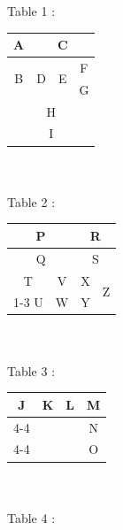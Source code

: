 \documentclass{article}
\begin{document}
Table 1 : \\

\setlength{\extrarowheight}{7pt}
\begin{tabular}{|c|c|c|c|}
\hline
A & \multicolumn{3}{c|}{C} \\
\hline
\multirow{2}{*}{B} & \multirow{2}{*}{D} & \multirow{2}{*}{E} & F \\
\cline{4-4}
 &  &  & G \\
\hline
\multicolumn{4}{|c|}{H} \\
\hline
\multicolumn{4}{|c|}{I} \\
\hline 
\end{tabular} \\ \\

Table 2 : \\

\setlength{\extrarowheight}{10pt}
\begin{tabular}{|c|c|c|c|}
\hline
\multicolumn{2}{|c|}{P} & \multicolumn{2}{c|}{R} \\
\hline
\multicolumn{2}{|c|}{Q} & \multicolumn{2}{c|}{S} \\
\hline
T & V & X & \multirow{2}{*}{Z}\\
\cline{1-3}
U & W & Y &  \\
\hline

\end{tabular} \\ \\

Table 3 : \\

\setlength{\extrarowheight}{7pt}
\begin{tabular}{|c|c|c|c|}

\hline
\multirow{3}{*}{J} & \multirow{3}{*}{K} & \multirow{3}{*}{L} & M \\
\cline{4-4}
 &  &  & N \\
\cline{4-4}
 &  &  & O \\
\hline
\end{tabular} \\ \\

Table 4 : \\

 \\
\end{document}
